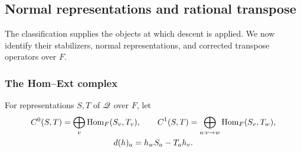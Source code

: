 \subsection{Normal representations and rational transpose}\label{m1:sec:normals}
The classification supplies the objects at which descent is applied.
We now identify their stabilizers, normal representations, and
corrected transpose operators over $F$.

\subsubsection{The Hom--Ext complex}\label{m1:subsec:hom-ext}
For representations $S,T$ of $\mathscr Q$ over $F$, let
\[
 \begin{gathered}
 C^0(S,T)=\bigoplus_v\operatorname{Hom}_F(S_v,T_v),\qquad
 C^1(S,T)=\bigoplus_{a:v\to w}\operatorname{Hom}_F(S_v,T_w),\\
 d(h)_a=h_wS_a-T_ah_v.
 \end{gathered}
\]


